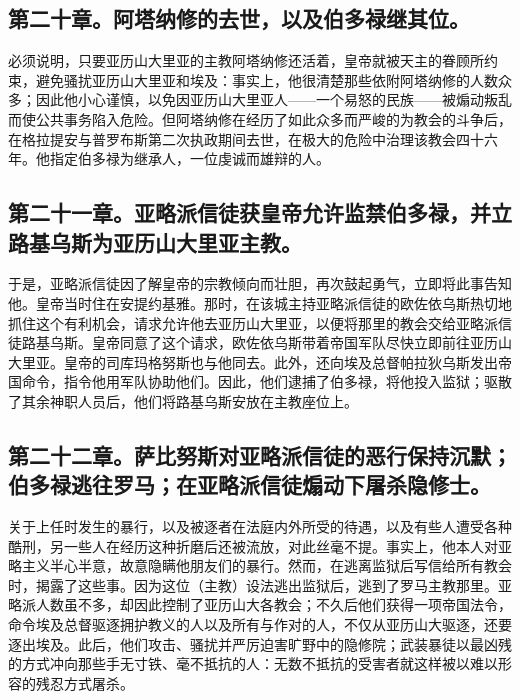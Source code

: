 
\subsection{第二十章。阿塔纳修的去世，以及伯多禄继其位。}

必须说明，只要亚历山大里亚的主教阿塔纳修还活着，皇帝就被天主的眷顾所约束，避免骚扰亚历山大里亚和埃及：事实上，他很清楚那些依附阿塔纳修的人数众多；因此他小心谨慎，以免因亚历山大里亚人——一个易怒的民族——被煽动叛乱而使公共事务陷入危险。但阿塔纳修在经历了如此众多而严峻的为教会的斗争后，在格拉提安与普罗布斯第二次执政期间去世，在极大的危险中治理该教会四十六年。他指定伯多禄为继承人，一位虔诚而雄辩的人。\par


\subsection{第二十一章。亚略派信徒获皇帝允许监禁伯多禄，并立路基乌斯为亚历山大里亚主教。}

于是，亚略派信徒因了解皇帝的宗教倾向而壮胆，再次鼓起勇气，立即将此事告知他。皇帝当时住在安提约基雅。那时，在该城主持亚略派信徒的欧佐依乌斯热切地抓住这个有利机会，请求允许他去亚历山大里亚，以便将那里的教会交给亚略派信徒路基乌斯。皇帝同意了这个请求，欧佐依乌斯带着帝国军队尽快立即前往亚历山大里亚。皇帝的司库玛格努斯也与他同去。此外，还向埃及总督帕拉狄乌斯发出帝国命令，指令他用军队协助他们。因此，他们逮捕了伯多禄，将他投入监狱；驱散了其余神职人员后，他们将路基乌斯安放在主教座位上。\par


\subsection{第二十二章。萨比努斯对亚略派信徒的恶行保持沉默；伯多禄逃往罗马；在亚略派信徒煽动下屠杀隐修士。}

关于上任时发生的暴行，以及被逐者在法庭内外所受的待遇，以及有些人遭受各种酷刑，另一些人在经历这种折磨后还被流放，对此丝毫不提。事实上，他本人对亚略主义半心半意，故意隐瞒他朋友们的暴行。然而，在逃离监狱后写信给所有教会时，揭露了这些事。因为这位（主教）设法逃出监狱后，逃到了罗马主教那里。亚略派人数虽不多，却因此控制了亚历山大各教会；不久后他们获得一项帝国法令，命令埃及总督驱逐拥护教义的人以及所有与作对的人，不仅从亚历山大驱逐，还要逐出埃及。此后，他们攻击、骚扰并严厉迫害旷野中的隐修院；武装暴徒以最凶残的方式冲向那些手无寸铁、毫不抵抗的人：无数不抵抗的受害者就这样被以难以形容的残忍方式屠杀。\par


